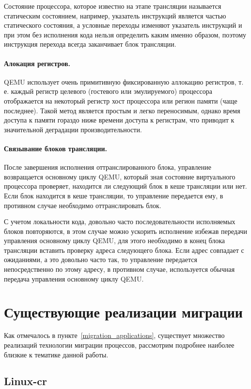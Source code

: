 Состояние процессора, которое известно на этапе трансляции называется статическим состоянием, например, указатель инструкций является частью статического состояния, а условные переходы изменяют указатель инструкций и при этом без исполнения кода нельзя определить каким именно образом, поэтому инструкция перехода всегда заканчивает блок трансляции.

\paragraph{Алокация регистров.} QEMU использует очень примитивную фиксированную аллокацию регистров, т. е. каждый регистр целевого (гостевого или эмулируемого) процессора отображается на некоторый регистр хост процессора или регион памяти (чаще последнее). Такой метод является простым и легко переносимым, однако время доступа к памяти гораздо ниже времени доступа к регистрам, что приводит к значительной деградации производительности.

\paragraph{Связывание блоков трансляции.} После завершения исполнения оттранслированного блока, управление возвращается основному циклу QEMU, который зная состояние виртуального процессора проверяет, находится ли следующий блок в кеше трансляции или нет. Если блок находится в кеше трансляции, то управление передается ему, в противном случае необходимо оттранслировать блок.

С учетом локальности кода, довольно часто последовательности исполняемых блоков повторяются, в этом случае можно ускорить исполнение избежав передачи управления основному циклу QEMU, для этого необходимо в конец блока трансляции вставить проверку адреса следующего блока. Если адрес совпадает с ожиданиями, а это довольно часто так, то управление передается непосредственно по этому адресу, в противном случае, используется обычная передача управления основному циклу QEMU.

\section{Существующие реализации миграции}

Как отмечалось в пункте~\ref{migration_applications}, существует множество реализаций технологии миграции процессов, рассмотрим подробнее наиболее близкие к тематике данной работы.

\subsection{Linux-cr}
\label{linux_cr}

